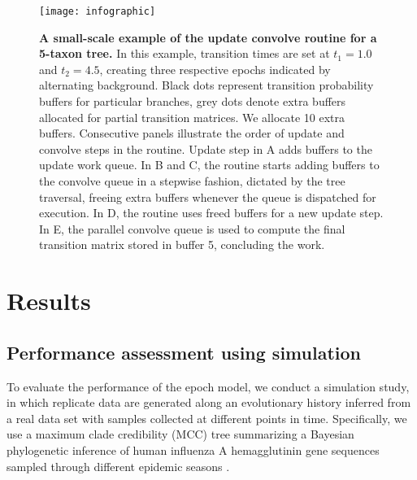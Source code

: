 \begin{figure}[h!]
\centering
\texttt{[image: infographic]} 
\caption{
{ \footnotesize 
{\bf A small-scale example of the update convolve routine for a 5-taxon tree.} 
In this example, transition times are set at $t_{1} = 1.0$ and $t_{2} = 4.5$, creating three respective epochs indicated by alternating background.
Black dots represent transition probability buffers for particular branches, grey dots denote extra buffers allocated for partial transition matrices.
We allocate 10 extra buffers.  
Consecutive panels illustrate the order of update and convolve steps in the routine.
Update step in A adds buffers to the update work queue. 
In B and C, the routine starts adding buffers to the convolve queue in a stepwise fashion, dictated by the tree traversal, freeing extra buffers whenever the queue is dispatched for execution. 
In D, the routine uses freed buffers for a new update step.
In E, the parallel convolve queue is used to compute the final transition matrix stored in buffer 5, concluding the work.
}%
}
\label{fig:UpdateConvolveExample}
\end{figure}

\section{Results}

\subsection{Performance assessment using simulation}

To evaluate the performance of the epoch model, we conduct a simulation study, in which replicate data are generated along an evolutionary history inferred from a real data set with samples collected at different points in time.
Specifically, we use a maximum clade credibility (MCC) tree summarizing a Bayesian phylogenetic inference of human influenza A hemagglutinin gene sequences sampled through different epidemic seasons \citep{Drummond2010}. 


